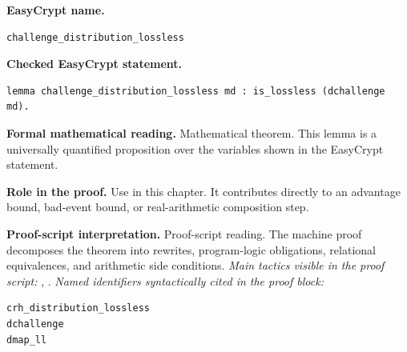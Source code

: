 \begin{formaltheorem}
\noindent\textbf{EasyCrypt name.}
\begin{lstlisting}[language=EasyCrypt,basicstyle=\ttfamily\scriptsize]
challenge_distribution_lossless
\end{lstlisting}
\noindent\textbf{Checked EasyCrypt statement.}
\begin{lstlisting}[language=EasyCrypt,basicstyle=\ttfamily\scriptsize]
lemma challenge_distribution_lossless md : is_lossless (dchallenge md).
\end{lstlisting}
\noindent\textbf{Formal mathematical reading.}
Mathematical theorem. This lemma is a universally quantified proposition over the variables shown in the EasyCrypt statement.

\noindent\textbf{Role in the proof.}
Use in this chapter. It contributes directly to an advantage bound, bad-event bound, or real-arithmetic composition step.

\noindent\textbf{Proof-script interpretation.}
Proof-script reading. The machine proof decomposes the theorem into rewrites, program-logic obligations, relational equivalences, and arithmetic side conditions.
\emph{Main tactics visible in the proof script:} , .
\emph{Named identifiers syntactically cited in the proof block:}
\begin{lstlisting}[language=EasyCrypt,basicstyle=\ttfamily\scriptsize]
crh_distribution_lossless
dchallenge
dmap_ll
\end{lstlisting}

\end{formaltheorem}

